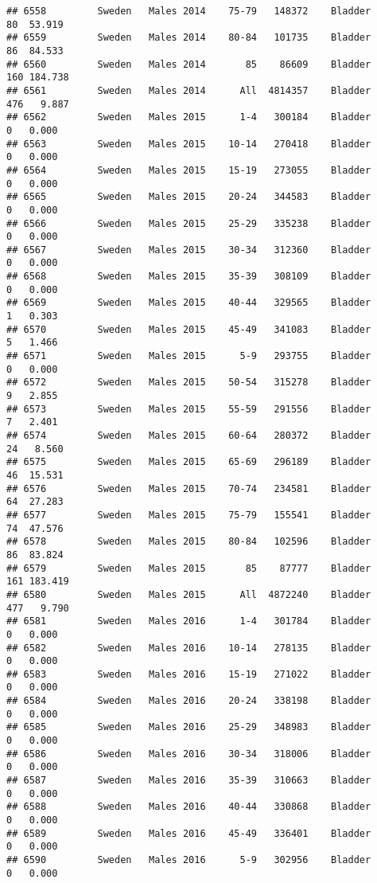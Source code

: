 \documentclass[
]{article}
\begin{document}
\begin{verbatim}
## 6558         Sweden   Males 2014    75-79   148372    Bladder     80  53.919
## 6559         Sweden   Males 2014    80-84   101735    Bladder     86  84.533
## 6560         Sweden   Males 2014       85    86609    Bladder    160 184.738
## 6561         Sweden   Males 2014      All  4814357    Bladder    476   9.887
## 6562         Sweden   Males 2015      1-4   300184    Bladder      0   0.000
## 6563         Sweden   Males 2015    10-14   270418    Bladder      0   0.000
## 6564         Sweden   Males 2015    15-19   273055    Bladder      0   0.000
## 6565         Sweden   Males 2015    20-24   344583    Bladder      0   0.000
## 6566         Sweden   Males 2015    25-29   335238    Bladder      0   0.000
## 6567         Sweden   Males 2015    30-34   312360    Bladder      0   0.000
## 6568         Sweden   Males 2015    35-39   308109    Bladder      0   0.000
## 6569         Sweden   Males 2015    40-44   329565    Bladder      1   0.303
## 6570         Sweden   Males 2015    45-49   341083    Bladder      5   1.466
## 6571         Sweden   Males 2015      5-9   293755    Bladder      0   0.000
## 6572         Sweden   Males 2015    50-54   315278    Bladder      9   2.855
## 6573         Sweden   Males 2015    55-59   291556    Bladder      7   2.401
## 6574         Sweden   Males 2015    60-64   280372    Bladder     24   8.560
## 6575         Sweden   Males 2015    65-69   296189    Bladder     46  15.531
## 6576         Sweden   Males 2015    70-74   234581    Bladder     64  27.283
## 6577         Sweden   Males 2015    75-79   155541    Bladder     74  47.576
## 6578         Sweden   Males 2015    80-84   102596    Bladder     86  83.824
## 6579         Sweden   Males 2015       85    87777    Bladder    161 183.419
## 6580         Sweden   Males 2015      All  4872240    Bladder    477   9.790
## 6581         Sweden   Males 2016      1-4   301784    Bladder      0   0.000
## 6582         Sweden   Males 2016    10-14   278135    Bladder      0   0.000
## 6583         Sweden   Males 2016    15-19   271022    Bladder      0   0.000
## 6584         Sweden   Males 2016    20-24   338198    Bladder      0   0.000
## 6585         Sweden   Males 2016    25-29   348983    Bladder      0   0.000
## 6586         Sweden   Males 2016    30-34   318006    Bladder      0   0.000
## 6587         Sweden   Males 2016    35-39   310663    Bladder      0   0.000
## 6588         Sweden   Males 2016    40-44   330868    Bladder      0   0.000
## 6589         Sweden   Males 2016    45-49   336401    Bladder      0   0.000
## 6590         Sweden   Males 2016      5-9   302956    Bladder      0   0.000

\end{verbatim}
\end{document}
